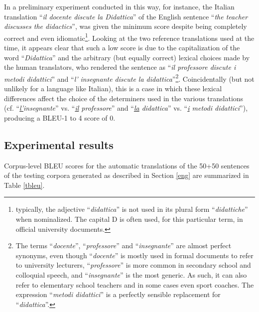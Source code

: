 In a preliminary experiment conducted in this way, for instance, the Italian translation ``\textit{il docente discute la Didattica}'' of the English sentence ``\textit{the teacher discusses the didactics}'', was given the minimum score despite being completely correct and even idiomatic\footnote{typically, the adjective ``\textit{didattica}'' is not used in its plural form ``\textit{didattiche}'' when nominalized. The capital D is often used, for this particular term, in official university documents.}. 
Looking at the two reference translations used at the time, it appears clear that such a low score is due to the capitalization of the word ``\textit{Didattica}'' and the arbitrary (but equally correct) lexical choices made by the human translators, who rendered the sentence as ``\textit{il professore discute i metodi didattici}'' and ``\textit{l' insegnante discute la didattica}''\footnote{The terms ``\textit{docente}'', ``\textit{professore}'' and ``\textit{insegnante}'' are almost perfect synonyms, even though ``\textit{docente}'' is mostly used in formal documents to refer to university lecturers, ``\textit{professore}'' is more common in secondary school and colloquial speech, and ``\textit{insegnante}'' is the most generic. As such, it can also refer to elementary school teachers and in some cases even sport coaches. The expression ``\textit{metodi didattici}'' is a perfectly sensible replacement for ``\textit{didattica}''.}. 
Coincidentally (but not unlikely for a language like Italian), this is a case in which these lexical differences affect the choice of the determiners used in the various translations (cf. ``\textit{\underline{l'}insegnante}'' vs. ``\textit{\underline{il} professore}'' and ``\textit{\underline{la} didattica}'' vs. ``\textit{\underline{i} metodi didattici}''), producing a BLEU-1 to 4 score of 0. \smallskip

\subsection{Experimental results} \label{res5}
Corpus-level BLEU scores for the automatic translations of the 50+50 sentences of the testing corpora generated as described in Section \ref{eng} are summarized in Table \ref{tbleu}.

